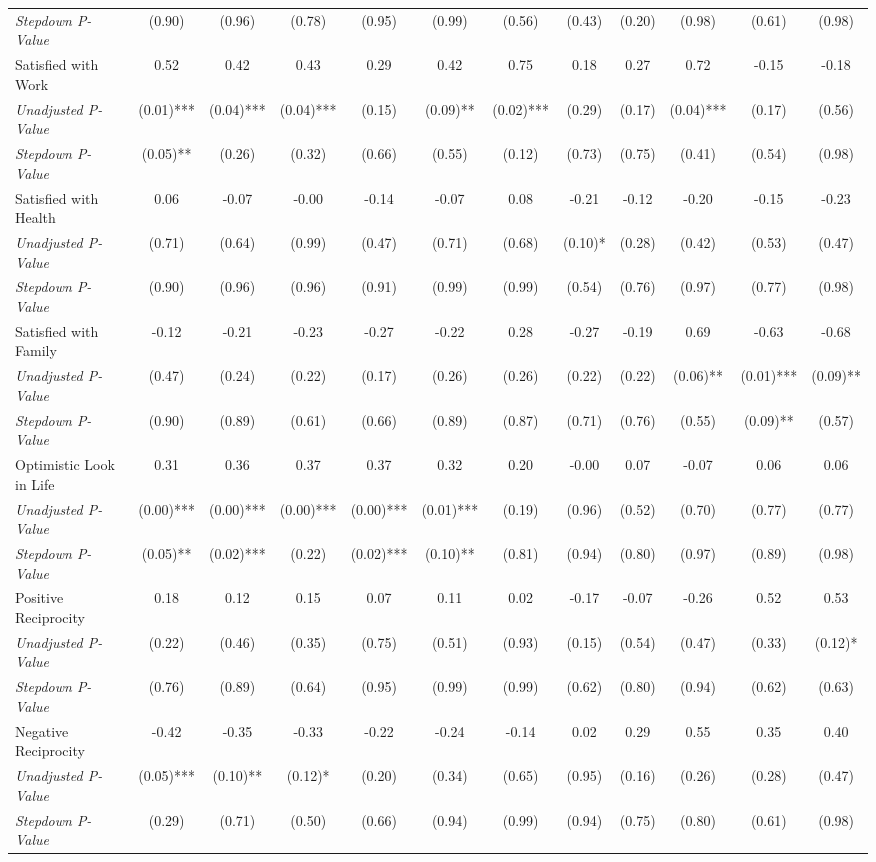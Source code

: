 \begin{tabular}{l c c c c c c c c c c c}
\quad \textit{Stepdown P-Value} & (0.90) & (0.96) & (0.78) & (0.95) & (0.99) & (0.56) & (0.43) & (0.20) & (0.98) & (0.61) & (0.98) \\
Satisfied with Work & 0.52 & 0.42 & 0.43 & 0.29 & 0.42 & 0.75 & 0.18 & 0.27 & 0.72 & -0.15 & -0.18 \\
\quad \textit{Unadjusted P-Value} & (0.01)*** & (0.04)*** & (0.04)*** & (0.15) & (0.09)** & (0.02)*** & (0.29) & (0.17) & (0.04)*** & (0.17) & (0.56) \\
\quad \textit{Stepdown P-Value} & (0.05)** & (0.26) & (0.32) & (0.66) & (0.55) & (0.12) & (0.73) & (0.75) & (0.41) & (0.54) & (0.98) \\
Satisfied with Health & 0.06 & -0.07 & -0.00 & -0.14 & -0.07 & 0.08 & -0.21 & -0.12 & -0.20 & -0.15 & -0.23 \\
\quad \textit{Unadjusted P-Value} & (0.71) & (0.64) & (0.99) & (0.47) & (0.71) & (0.68) & (0.10)* & (0.28) & (0.42) & (0.53) & (0.47) \\
\quad \textit{Stepdown P-Value} & (0.90) & (0.96) & (0.96) & (0.91) & (0.99) & (0.99) & (0.54) & (0.76) & (0.97) & (0.77) & (0.98) \\
Satisfied with Family & -0.12 & -0.21 & -0.23 & -0.27 & -0.22 & 0.28 & -0.27 & -0.19 & 0.69 & -0.63 & -0.68 \\
\quad \textit{Unadjusted P-Value} & (0.47) & (0.24) & (0.22) & (0.17) & (0.26) & (0.26) & (0.22) & (0.22) & (0.06)** & (0.01)*** & (0.09)** \\
\quad \textit{Stepdown P-Value} & (0.90) & (0.89) & (0.61) & (0.66) & (0.89) & (0.87) & (0.71) & (0.76) & (0.55) & (0.09)** & (0.57) \\
Optimistic Look in Life & 0.31 & 0.36 & 0.37 & 0.37 & 0.32 & 0.20 & -0.00 & 0.07 & -0.07 & 0.06 & 0.06 \\
\quad \textit{Unadjusted P-Value} & (0.00)*** & (0.00)*** & (0.00)*** & (0.00)*** & (0.01)*** & (0.19) & (0.96) & (0.52) & (0.70) & (0.77) & (0.77) \\
\quad \textit{Stepdown P-Value} & (0.05)** & (0.02)*** & (0.22) & (0.02)*** & (0.10)** & (0.81) & (0.94) & (0.80) & (0.97) & (0.89) & (0.98) \\
Positive Reciprocity & 0.18 & 0.12 & 0.15 & 0.07 & 0.11 & 0.02 & -0.17 & -0.07 & -0.26 & 0.52 & 0.53 \\
\quad \textit{Unadjusted P-Value} & (0.22) & (0.46) & (0.35) & (0.75) & (0.51) & (0.93) & (0.15) & (0.54) & (0.47) & (0.33) & (0.12)* \\
\quad \textit{Stepdown P-Value} & (0.76) & (0.89) & (0.64) & (0.95) & (0.99) & (0.99) & (0.62) & (0.80) & (0.94) & (0.62) & (0.63) \\
Negative Reciprocity & -0.42 & -0.35 & -0.33 & -0.22 & -0.24 & -0.14 & 0.02 & 0.29 & 0.55 & 0.35 & 0.40 \\
\quad \textit{Unadjusted P-Value} & (0.05)*** & (0.10)** & (0.12)* & (0.20) & (0.34) & (0.65) & (0.95) & (0.16) & (0.26) & (0.28) & (0.47) \\
\quad \textit{Stepdown P-Value} & (0.29) & (0.71) & (0.50) & (0.66) & (0.94) & (0.99) & (0.94) & (0.75) & (0.80) & (0.61) & (0.98) \\
\bottomrule
\end{tabular}
